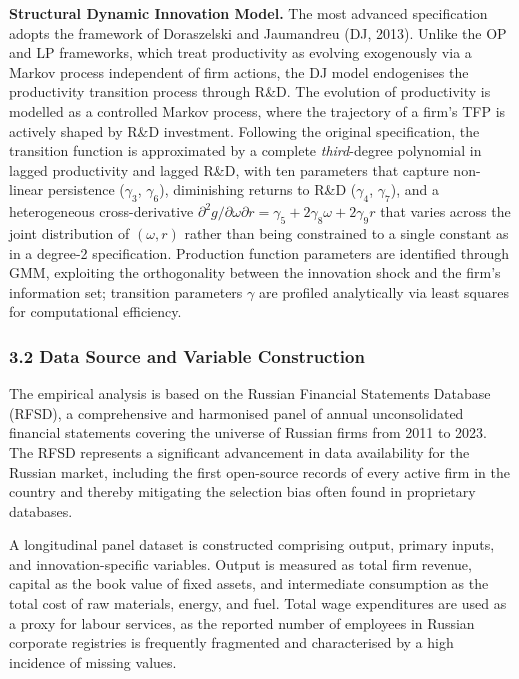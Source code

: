 \documentclass[a4paper, 12pt]{article}
\begin{document}
\textbf{Structural Dynamic Innovation Model.} The most advanced specification adopts the framework of Doraszelski and Jaumandreu (DJ, 2013). Unlike the OP and LP frameworks, which treat productivity as evolving exogenously via a Markov process independent of firm actions, the DJ model endogenises the productivity transition process through R\&D. The evolution of productivity is modelled as a controlled Markov process, where the trajectory of a firm's TFP is actively shaped by R\&D investment. Following the original specification, the transition function is approximated by a complete \emph{third}-degree polynomial in lagged productivity and lagged R\&D, with ten parameters that capture non-linear persistence ($\gamma_3$, $\gamma_6$), diminishing returns to R\&D ($\gamma_4$, $\gamma_7$), and a heterogeneous cross-derivative $\partial^2 g/\partial\omega\partial r = \gamma_5 + 2\gamma_8\omega + 2\gamma_9 r$ that varies across the joint distribution of $(\omega, r)$ rather than being constrained to a single constant as in a degree-2 specification. Production function parameters are identified through GMM, exploiting the orthogonality between the innovation shock and the firm's information set; transition parameters $\gamma$ are profiled analytically via least squares for computational efficiency.

\subsubsection{3.2 Data Source and Variable Construction}

The empirical analysis is based on the Russian Financial Statements Database (RFSD), a comprehensive and harmonised panel of annual unconsolidated financial statements covering the universe of Russian firms from 2011 to 2023. The RFSD represents a significant advancement in data availability for the Russian market, including the first open-source records of every active firm in the country and thereby mitigating the selection bias often found in proprietary databases.

A longitudinal panel dataset is constructed comprising output, primary inputs, and innovation-specific variables. Output is measured as total firm revenue, capital as the book value of fixed assets, and intermediate consumption as the total cost of raw materials, energy, and fuel. Total wage expenditures are used as a proxy for labour services, as the reported number of employees in Russian corporate registries is frequently fragmented and characterised by a high incidence of missing values.
\end{document}
